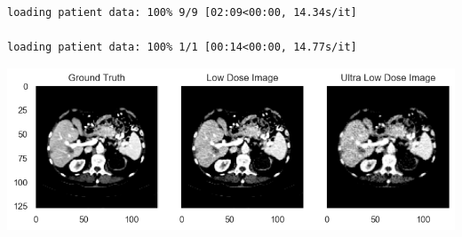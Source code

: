 \documentclass[a4paper, 11pt]{article}
\begin{document}
\begin{verbatim}
loading patient data: 100% 9/9 [02:09<00:00, 14.34s/it]

loading patient data: 100% 1/1 [00:14<00:00, 14.77s/it]

\end{verbatim}

\begin{center}
\includegraphics[width=.9\linewidth]{./.ob-jupyter/9dad22006e92686768aeab3338ada870ec4f2d9c.png}
\end{center}
\end{document}
